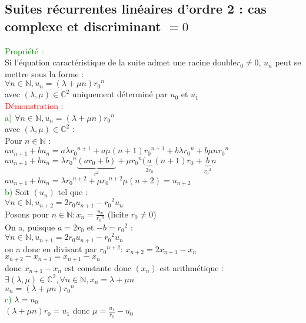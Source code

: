 \documentclass{article}
\begin{document}
\subsection{Suites récurrentes linéaires d'ordre 2 : cas complexe et discriminant $= 0$}
\textcolor{green}{Propriété :} \\ 
Si l'équation caractéristique de la suite admet une racine double$r_0 \neq 0$, $u_n$ peut se mettre sous la forme : \\ 
$\forall n \in \mathbb{N}, u_n=(\lambda + \mu n){r_0}^n$ \\ 
avec $(\lambda, \mu) \in \mathbb{C}^2$ uniquement déterminé par $u_0$ et $u_1$ \\
\textcolor{red}{Démonstration :} \\ 
\textcolor{green}{a)} $\forall n \in \mathbb{N},u_n=(\lambda + \mu n){r_0}^n$ \\ 
avec $(\lambda ,\mu) \in \mathbb{C}^2$ : \\ 
Pour $n \in \mathbb{N}$ : \\ 
$au_{n+1}+bu_{n}=a \lambda {r_0}^{n+1}+a\mu (n+1){r_0}^{n+1}+b \lambda {r_0}^n+b \mu n {r_0}^n$ \\ 
$au_{n+1}+bu_{n}=\lambda {r_0}^n\underbrace{(ar_0+b)}_{r^2}+ \mu {r_0}^n(\underbrace{a}_{2r_0}(n+1)r_0+\underbrace{b}_{{r_0}^2}n$ \\ 
$au_{n+1}+bu_{n}=\lambda {r_0}^{n+2}+ \mu {r_0}^{n+2} \mu (n+2)=u_{n+2}$ \\ 
\textcolor{green}{b)} Soit $(u_n)$ tel que : \\ 
$\forall n \in \mathbb{N}, u_{n+2}=2r_0u_{n+1}-{r_0}^2u_n$ \\ 
Posons pour $n \in \mathbb{N}: x_n=\frac{u_n}{{r_0}^n}$ (licite $r_0 \neq 0$) \\ 
On a, puisque $a=2r_0$ et $-b={r_0}^2$ : \\ 
$\forall n \in \mathbb{N}, u_{n+1}=2r_0u_{n+1}-{r_0}^2u_n$ \\ 
on a donc  en divisant par ${r_0}^{n+2}$: $x_{n+2}=2x_{n+1}-x_n$ \\ 
$x_{n+2}-x_{n+1}=x_{n+1}-x_n$ \\ 
donc $x_{n+1}-x_n$ est constante donc $(x_n)$ est arithmétique : \\ 
$\exists(\lambda, \mu) \in \mathbb{C}^2, \forall n \in \mathbb{N},x_n=\lambda+ \mu n$ \\ 
$u_n=(\lambda+ \mu n){r_0}^n$ \\ 
\textcolor{green}{c)} $ \lambda = u_0$ \\ 
$(\lambda + \mu n)r_0=u_1$
donc $\mu = \frac{u_1}{r_0}-u_0$
\end{document}
